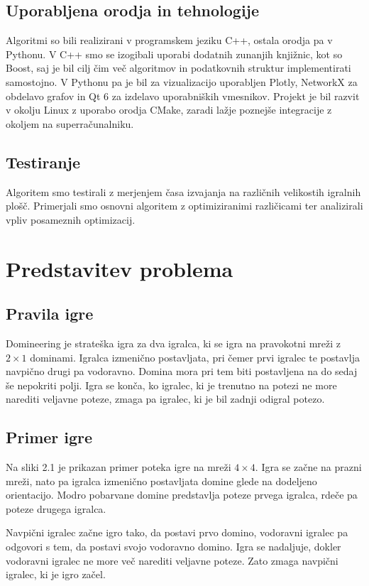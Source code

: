 \documentclass[12pt]{report}
\begin{document}
\section{Uporabljena orodja in tehnologije}
Algoritmi so bili realizirani v programskem jeziku C++, ostala orodja pa v Pythonu. V C++ smo se izogibali uporabi dodatnih zunanjih knjižnic, kot so Boost, saj je bil cilj čim več algoritmov in podatkovnih struktur implementirati samostojno. V Pythonu pa je bil za vizualizacijo uporabljen Plotly, NetworkX za obdelavo grafov in Qt 6 za izdelavo uporabniških vmesnikov. Projekt je bil razvit v okolju Linux z uporabo orodja CMake, zaradi lažje poznejše integracije z okoljem na superračunalniku.

\section{Testiranje}
Algoritem smo testirali z merjenjem časa izvajanja na različnih velikostih igralnih plošč. Primerjali smo osnovni algoritem z optimiziranimi različicami ter analizirali vpliv posameznih optimizacij.

\chapter{Predstavitev problema}
\section{Pravila igre}
Domineering je strateška igra za dva igralca, ki se igra na pravokotni mreži z $2 \times 1$ dominami. Igralca izmenično postavljata, pri čemer prvi igralec te postavlja navpično drugi pa vodoravno. Domina mora pri tem biti postavljena na do sedaj še nepokriti polji. Igra se konča, ko igralec, ki je trenutno na potezi ne more narediti veljavne poteze, zmaga pa igralec, ki je bil zadnji odigral potezo.

\section{Primer igre}
Na sliki 2.1 je prikazan primer poteka igre na mreži $4 \times 4$. Igra se začne na prazni mreži, nato pa igralca izmenično postavljata domine glede na dodeljeno orientacijo. Modro pobarvane domine predstavlja poteze prvega igralca, rdeče pa poteze drugega igralca.

Navpični igralec začne igro tako, da postavi prvo domino, vodoravni igralec pa odgovori s tem, da postavi svojo vodoravno domino. Igra se nadaljuje, dokler vodoravni igralec ne more več narediti veljavne poteze. Zato zmaga navpični igralec, ki je igro začel.

\end{document}
